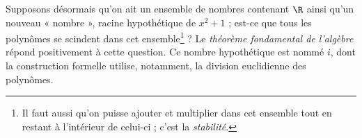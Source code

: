 {	Supposons désormais qu'on ait un ensemble de nombres contenant $\R$ ainsi qu'un nouveau « nombre », racine hypothétique de $x^2 + 1$ ; est-ce que tous les polynômes se scindent dans cet ensemble\footnote{Il faut aussi qu'on puisse ajouter et multiplier dans cet ensemble tout en restant à l'intérieur de celui-ci ; c'est la \emph{stabilité}.} ? 
	Le \emph{théorème fondamental de l'algèbre} répond positivement à cette question.
	Ce nombre hypothétique est nommé $i$, dont la construction formelle utilise, notamment, la division euclidienne des polynômes.
}



\newpage
{}
\shipoutAnswer


